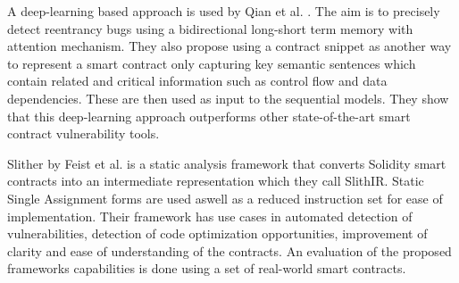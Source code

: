 \documentclass[sigconf]{acmart}
\begin{document}
A deep-learning based approach is used by Qian et al. \cite{automated}. The aim is to precisely detect reentrancy bugs using a bidirectional long-short term memory with attention mechanism. They also propose using a contract snippet as another way to represent a smart contract only capturing key semantic sentences which contain related and critical information such as control flow and data dependencies. These are then used as input to the sequential models. They show that this deep-learning approach outperforms other state-of-the-art smart contract vulnerability tools.

Slither by Feist et al. \cite{slither} is a static analysis framework that converts Solidity smart contracts into an intermediate representation which they call SlithIR. Static Single Assignment forms are used aswell as a reduced instruction set for ease of implementation. Their framework has use cases in automated detection of vulnerabilities, detection of code optimization opportunities, improvement of clarity and ease of understanding of the contracts. An evaluation of the proposed frameworks capabilities is done using a set of real-world smart contracts. 





\end{document}
